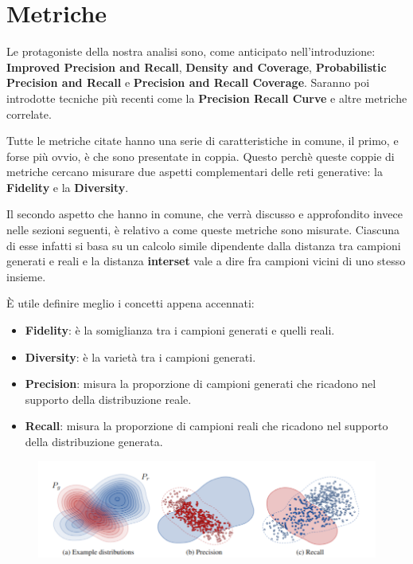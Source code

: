 \chapter{Metriche}\label{ch:chapter1}

Le protagoniste della nostra analisi sono, come anticipato nell'introduzione: 
\textbf{Improved Precision and Recall}, \textbf{Density and Coverage}, \textbf{Probabilistic Precision and Recall} e \textbf{Precision and Recall Coverage}. 
Saranno poi introdotte tecniche più recenti come la \textbf{Precision Recall Curve} e altre metriche correlate.\

Tutte le metriche citate hanno una serie di caratteristiche in comune, il primo, e forse più ovvio, è che sono presentate in coppia. 
Questo perchè queste coppie di metriche cercano misurare due aspetti complementari delle reti generative: la \textbf{Fidelity} e la \textbf{Diversity}.\ 

Il secondo aspetto che hanno in comune, che verrà discusso e approfondito invece nelle sezioni seguenti, è relativo a come queste metriche sono misurate. Ciascuna di esse infatti 
si basa su un calcolo simile dipendente dalla distanza tra campioni generati e reali e la distanza \textbf{interset} vale a dire fra campioni vicini di uno stesso insieme.\

È utile definire meglio i concetti appena accennati: 
\begin{itemize}
    \item \textbf{Fidelity}: è la somiglianza tra i campioni generati e quelli reali.
    \item \textbf{Diversity}: è la varietà tra i campioni generati.
    \item \textbf{Precision}: misura la proporzione di campioni generati che ricadono nel supporto della distribuzione reale.
    \item \textbf{Recall}: misura la proporzione di campioni reali che ricadono nel supporto della distribuzione generata.
\end{itemize}

\begin{figure}[htbp]
    \centering
    \includegraphics[width=\linewidth]{../images/2_PrecisionRecallManifold_si.png}
\end{figure}

